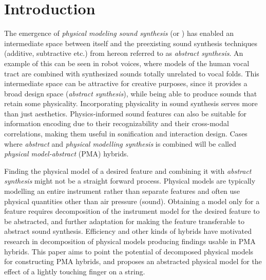 \documentclass{sigchi}
\def\plainkeywords{physical modelling; audio features}
\begin{document}

\keywords{\plainkeywords}

\printccsdesc

\section{Introduction}
The emergence of \textit{physical modeling sound synthesis} (or ) has enabled an intermediate space between itself and the preexisting sound synthesis techniques (additive, subtractive etc.) from hereon referred to as \textit{abstract synthesis}. An example of this can be seen in robot voices, where models of the human vocal tract are combined with synthesized sounds totally unrelated to vocal folds. This intermediate space can be attractive for creative purposes, since it provides a broad design space (\textit{abstract synthesis}), while being able to produce sounds that retain some physicality. Incorporating physicality in sound synthesis serves more than just aesthetics. Physics-informed sound features can also be suitable for information encoding due to their recognizability and their cross-modal correlations, making them useful in sonification and interaction design. Cases where \textit{abstract} and \textit{physical modelling synthesis} is combined will be called \textit{physical model-abstract} (PMA) hybrids.

Finding the physical model of a desired feature and combining it with \textit{abstract synthesis} might not be a straight forward process. Physical models are typically modelling an entire instrument rather than separate features and often use physical quantities other than air pressure (sound). Obtaining a model only for a feature requires decomposition of the instrument model for the desired feature to be abstracted, and further adaptation for making the feature transferable to abstract sound synthesis. Efficiency and other kinds of hybrids have motivated research in decomposition of physical models \cite{erkut_modular_2005,karjalainen_plucked-string_1998} producing findings usable in PMA hybrids. This paper aims to point the potential of decomposed physical models for constructing PMA hybrids, and proposes an abstracted physical model for the effect of a lightly touching finger on a string.
\end{document}
